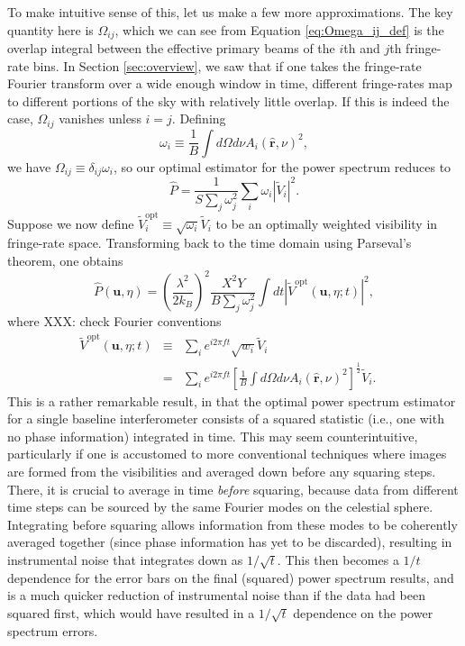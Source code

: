 \documentclass[twocolumn,apj,numberedappendix]{emulateapj}
\newcommand{\rhat}{\hat{\mathbf{r}}}
\begin{document}
To make intuitive sense of this, let us make a few more approximations. The key quantity here is $\Omega_{ij}$, which we can see from Equation \eqref{eq:Omega_ij_def} is the overlap integral between the effective primary beams of the $i$th and $j$th fringe-rate bins. In Section \ref{sec:overview}, we saw that if one takes the fringe-rate Fourier transform over a wide enough window in time, different fringe-rates map to different portions of the sky with relatively little overlap. If this is indeed the case, $\Omega_{ij}$ vanishes unless $i=j$. Defining
\begin{equation}
\omega_i  \equiv \frac{1}{B} \int d\Omega d\nu A_i(\rhat,\nu)^2,
\end{equation}
we have $\Omega_{ij} \equiv \delta_{ij} \omega_i$, so our optimal estimator for the power spectrum reduces to
\begin{equation}
\widehat{P} = \frac{1}{S \sum_j \omega_j^2}\sum_i \omega_i | \widetilde{V}_i |^2 .
\end{equation}
Suppose we now define $\widetilde{V}^\textrm{opt}_i \equiv \sqrt{\omega_i} \widetilde{V}_i$ to be an optimally weighted visibility in fringe-rate space. Transforming back to the time domain using Parseval's theorem, one obtains
\begin{equation}
\label{eq:finalEst}
\widehat{P}(\mathbf{u}, \eta) = \left( \frac{\lambda^2}{2 k_B} \right)^2 \frac{X^2 Y}{B\sum_j \omega_j^2} \int dt |\widetilde{V}^\textrm{opt} (\mathbf{u}, \eta; t)|^2,
\end{equation}
where XXX: check Fourier conventions
\begin{eqnarray}
\widetilde{V}^\textrm{opt} (\mathbf{u}, \eta; t) &\equiv& \sum_i e^{i 2 \pi f t} \sqrt{w_i} \widetilde{V}_i \nonumber \\
&=&  \sum_i e^{i 2 \pi f t} \left[\frac{1}{B} \int d\Omega d\nu A_i(\rhat,\nu)^2\right]^\frac{1}{2} \widetilde{V}_i. \quad
\end{eqnarray}
This is a rather remarkable result, in that the optimal power spectrum estimator for a single baseline interferometer consists of a squared statistic (i.e., one with no phase information) integrated in time. This may seem counterintuitive, particularly if one is accustomed to more conventional techniques where images are formed from the visibilities and averaged down before any squaring steps. There, it is crucial to average in time \emph{before} squaring, because data from different time steps can be sourced by the same Fourier modes on the celestial sphere. Integrating before squaring allows information from these modes to be coherently averaged together (since phase information has yet to be discarded), resulting in instrumental noise that integrates down as $1/\sqrt{t}$. This then becomes a $1/t$ dependence for the error bars on the final (squared) power spectrum results, and is a much quicker reduction of instrumental noise than if the data had been squared first, which would have resulted in a $1/\sqrt{t}$ dependence on the power spectrum errors.
\end{document}
